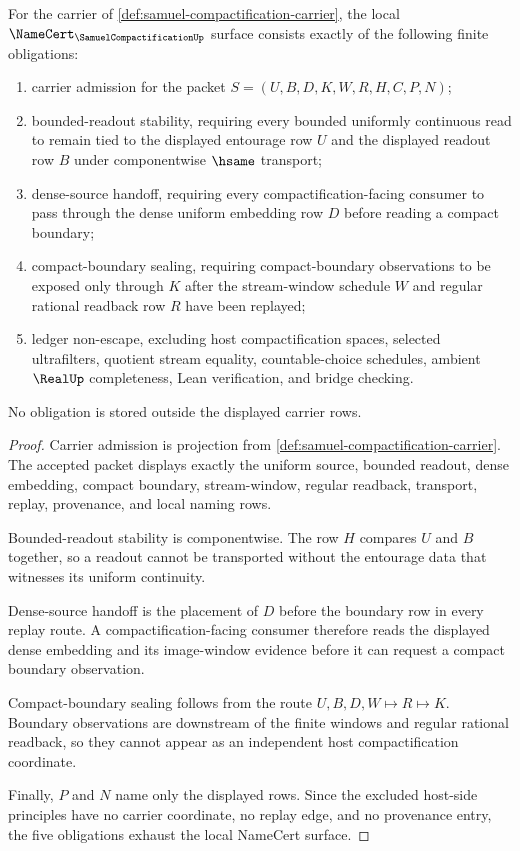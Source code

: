 \begin{theorem}
\label{thm:samuel-compactification-namecert-obligations}
For the carrier of \autoref{def:samuel-compactification-carrier}, the local $\NameCert_{\SamuelCompactificationUp}$ surface consists exactly of the following finite obligations:
\begin{enumerate}
\item carrier admission for the packet $S=(U,B,D,K,W,R,H,C,P,N)$;
\item bounded-readout stability, requiring every bounded uniformly continuous read to remain tied to the displayed entourage row $U$ and the displayed readout row $B$ under componentwise $\hsame$ transport;
\item dense-source handoff, requiring every compactification-facing consumer to pass through the dense uniform embedding row $D$ before reading a compact boundary;
\item compact-boundary sealing, requiring compact-boundary observations to be exposed only through $K$ after the stream-window schedule $W$ and regular rational readback row $R$ have been replayed;
\item ledger non-escape, excluding host compactification spaces, selected ultrafilters, quotient stream equality, countable-choice schedules, ambient $\RealUp$ completeness, Lean verification, and bridge checking.
\end{enumerate}
No obligation is stored outside the displayed carrier rows.
\end{theorem}
\begin{proof}
Carrier admission is projection from \autoref{def:samuel-compactification-carrier}. The accepted packet displays exactly the uniform source, bounded readout, dense embedding, compact boundary, stream-window, regular readback, transport, replay, provenance, and local naming rows.

Bounded-readout stability is componentwise. The row $H$ compares $U$ and $B$ together, so a readout cannot be transported without the entourage data that witnesses its uniform continuity.

Dense-source handoff is the placement of $D$ before the boundary row in every replay route. A compactification-facing consumer therefore reads the displayed dense embedding and its image-window evidence before it can request a compact boundary observation.

Compact-boundary sealing follows from the route $U,B,D,W \longmapsto R \longmapsto K$. Boundary observations are downstream of the finite windows and regular rational readback, so they cannot appear as an independent host compactification coordinate.

Finally, $P$ and $N$ name only the displayed rows. Since the excluded host-side principles have no carrier coordinate, no replay edge, and no provenance entry, the five obligations exhaust the local NameCert surface.
\end{proof}

